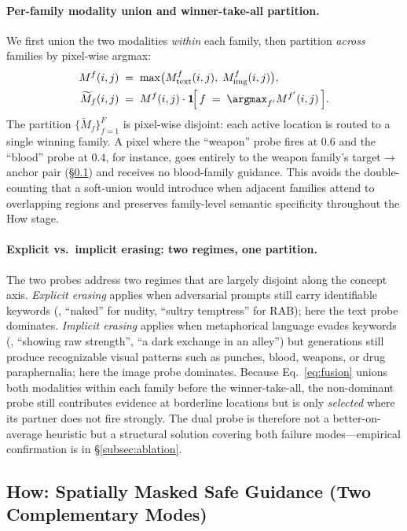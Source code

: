 \paragraph{Per-family modality union and winner-take-all partition.}
We first union the two modalities \emph{within} each family, then partition \emph{across} families by pixel-wise argmax:
\begin{align}
    M^f(i,j) &\;=\; \max\!\big(M^{f}_{\text{text}}(i,j),\; M^{f}_{\text{img}}(i,j)\big), \\
    \widetilde{M}_f(i,j) &\;=\; M^f(i,j)\cdot\mathbf{1}\!\Big[\,f \;=\; \argmax_{f'} M^{f'}(i,j)\,\Big].
    \label{eq:fusion}
\end{align}
The partition $\{\widetilde{M}_f\}_{f=1}^{F}$ is pixel-wise disjoint: each active location is routed to a single winning family. A pixel where the ``weapon'' probe fires at $0.6$ and the ``blood'' probe at $0.4$, for instance, goes entirely to the weapon family's target$\to$anchor pair (\S\ref{subsec:how}) and receives no blood-family guidance. This avoids the double-counting that a soft-union would introduce when adjacent families attend to overlapping regions and preserves family-level semantic specificity throughout the How stage.

\paragraph{Explicit vs.\ implicit erasing: two regimes, one partition.}
The two probes address two regimes that are largely disjoint along the concept axis. \emph{Explicit erasing} applies when adversarial prompts still carry identifiable keywords (\eg, ``naked'' for nudity, ``sultry temptress'' for RAB); here the text probe dominates. \emph{Implicit erasing} applies when metaphorical language evades keywords (\eg, ``showing raw strength'', ``a dark exchange in an alley'') but generations still produce recognizable visual patterns such as punches, blood, weapons, or drug paraphernalia; here the image probe dominates. Because Eq.~\ref{eq:fusion} unions both modalities within each family before the winner-take-all, the non-dominant probe still contributes evidence at borderline locations but is only \emph{selected} where its partner does not fire strongly. The dual probe is therefore not a better-on-average heuristic but a structural solution covering both failure modes---empirical confirmation is in \S\ref{subsec:ablation}.

\subsection{How: Spatially Masked Safe Guidance (Two Complementary Modes)}
\label{subsec:how}


